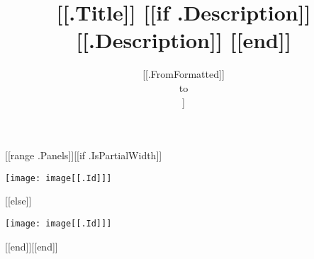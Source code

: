 \documentclass{article}
\begin{document}
\title{[[.Title]] [[if .Description]] \\ \small [[.Description]] [[end]]}
\date{[[.FromFormatted]]\\to\\[[.ToFormatted]]}
\maketitle
\begin{center}
[[range .Panels]][[if .IsPartialWidth]]\begin{minipage}{[[.Width]]\textwidth}
\texttt{[image: image[[.Id]]]}
\end{minipage}
[[else]]\par
\vspace{0.5cm}
\texttt{[image: image[[.Id]]]}
\par
\vspace{0.5cm}
[[end]][[end]]

\end{center}
\end{document}
